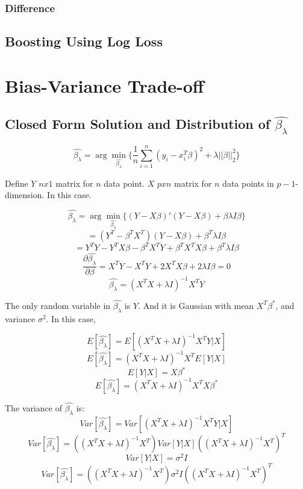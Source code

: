 \documentclass[letter,11pt]{article}
\begin{document}
	\subsubsection{Difference}
	\subsection{Boosting Using Log Loss}
	
	
	\section{Bias-Variance Trade-off}
	\subsection{Closed Form Solution and Distribution of $\hat{\beta_\lambda}$}
	
	\begin{equation}
	\hat{\beta_\lambda} = \arg \min_{\hat{\beta_\lambda}} \bigg\{\frac{1}{n}\sum_{i=1}^{n}(y_i-x_i^T\beta)^2 + \lambda||\beta||_2^2\bigg\}
	\end{equation}
	
	Define $Y$ $nx1$ matrix for $n$ data point. $X$ $pxn$ matrix for $n$ data points in $p-1$-dimension. In this case.
	
	\begin{equation}
	\hat{\beta_\lambda} = \arg \min_{\hat{\beta_\lambda}} \bigg\{(Y-X\beta)'(Y-X\beta) +\beta\lambda I\beta \bigg\}
	\end{equation}
	$$ = (Y^T-\beta^TX^T)(Y-X\beta) + \beta^T\lambda I \beta$$
	$$ = Y^TY - Y^TX\beta-\beta^TX^TY + \beta^TX^TX\beta + \beta^T\lambda I \beta$$
	\begin{equation}
	\frac{\partial \hat{\beta_\lambda}}{\partial \beta} = X^TY - X^TY + 2X^TX\beta + 2\lambda I \beta = 0
	\end{equation}	
	\begin{equation}
	\hat{\beta_\lambda} = (X^TX + \lambda I)^{-1} X^TY
	\end{equation}

	The only random variable in $\hat{\beta_\lambda}$ is $Y$. And it is Gaussian with mean $X^T\beta^*$, and variance $\sigma^2$. In this case,
	
	$$E[\hat{\beta_\lambda}] = E[(X^TX + \lambda I)^{-1} X^TY|X]$$
	$$E[\hat{\beta_\lambda}] = (X^TX + \lambda I)^{-1} X^T E[Y|X]$$
	$$E[Y|X] = X\beta^*$$
	$$E[\hat{\beta_\lambda}] = (X^TX + \lambda I)^{-1} X^TX\beta^*$$
	
	The variance of $\hat{\beta_\lambda}$ is:
	$$Var[\hat{\beta_\lambda}] = Var[(X^TX + \lambda I)^{-1} X^TY|X]$$
	$$Var[\hat{\beta_\lambda}] = ((X^TX + \lambda I)^{-1}X^T) Var[Y|X] ((X^TX + \lambda I)^{-1}X^T)^T$$
	$$Var[Y|X] = \sigma^2 I$$
	$$Var[\hat{\beta_\lambda}] = ((X^TX + \lambda I)^{-1}X^T) \sigma^2 I ((X^TX + \lambda I)^{-1}X^T)^T$$
\end{document}
